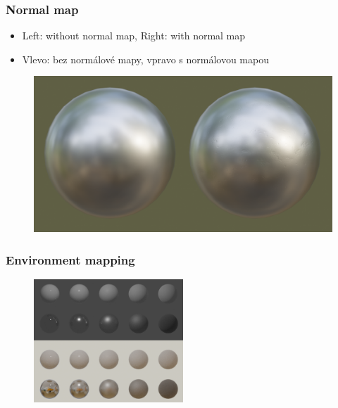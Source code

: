 \begin{frame}\frametitle{Normal map}
  \scriptsize
  \begin{itemize}
    \item Left: without normal map, Right: with normal map
  \end{itemize}
  \begin{itemize}
    \item Vlevo: bez normálové mapy, vpravo s normálovou mapou
  \end{itemize}
  \begin{figure}[ht]
    \includegraphics[width=\textwidth]{pics/physicallyBasedRendering/metal/normal_map}
  \end{figure}
\end{frame}

\begin{frame}\frametitle{Environment mapping}
  \scriptsize
  \begin{figure}[ht]
    \includegraphics[width=0.5\textwidth]{pics/physicallyBasedRendering/metal/environment_map}
  \end{figure}
\end{frame}

